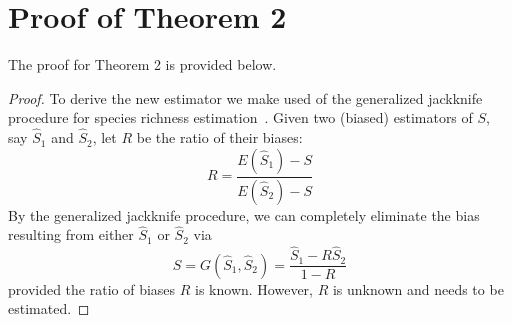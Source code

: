 \section{Proof of Theorem 2}
\label{sec:prth2}
The proof for Theorem 2 is provided below.
\begin{proof}
To derive the new estimator we make used of the generalized jackknife procedure for species richness estimation~\cite{heltshe1983estimating}. Given two (biased) estimators of $S$, say $\hat{S}_1$ and $\hat{S}_2$, let $R$ be the ratio of their biases:
\begin{equation}
R = \frac{E(\hat{S}_1) - S}{E(\hat{S}_2) - S}
\end{equation}
By the generalized jackknife procedure, we can completely eliminate the bias resulting from either $\hat{S}_1$ or $\hat{S}_2$ via
\begin{equation}
S = G(\hat{S}_1, \hat{S}_2) = \frac{\hat{S}_1 - R\hat{S}_2}{1 - R}
\label{eq:jknife}
\end{equation}
provided the ratio of biases $R$ is known. However, $R$ is unknown and needs to be estimated. 


\end{proof}
